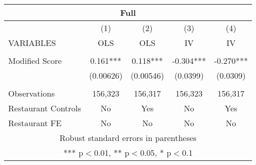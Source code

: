 \begin{tabular}{lcccc}
\multicolumn{5}{c}{Full} \\ \hline
 & (1) & (2) & (3) & (4) \\
VARIABLES & OLS & OLS & IV & IV \\ \hline
 &  &  &  &  \\
Modified Score & 0.161*** & 0.118*** & -0.304*** & -0.270*** \\
 & (0.00626) & (0.00546) & (0.0399) & (0.0309) \\
 &  &  &  &  \\
Observations & 156,323 & 156,317 & 156,323 & 156,317 \\
Restaurant Controls & No & Yes & No & Yes \\
 Restaurant FE & No & No & No & No \\ \hline
\multicolumn{5}{c}{ Robust standard errors in parentheses} \\
\multicolumn{5}{c}{ *** p$<$0.01, ** p$<$0.05, * p$<$0.1} \\
\end{tabular}
